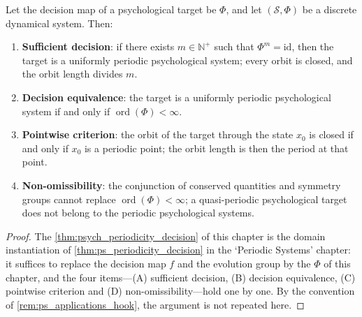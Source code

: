 \begin{theorem}\label{thm:psych_periodicity_decision}
Let the decision map of a psychological target be $\Phi$, and let $(\mathcal S,\Phi)$ be a discrete dynamical system. Then:
\begin{enumerate}[label=(\Alph*)]
    \item \textbf{Sufficient decision}: if there exists $m\in\mathbb N^+$ such that $\Phi^m=\mathrm{id}$, then the target is a uniformly periodic psychological system; every orbit is closed, and the orbit length divides $m$.
    \item \textbf{Decision equivalence}: the target is a uniformly periodic psychological system if and only if $\operatorname{ord}(\Phi)<\infty$.
    \item \textbf{Pointwise criterion}: the orbit of the target through the state $x_0$ is closed if and only if $x_0$ is a periodic point; the orbit length is then the period at that point.
    \item \textbf{Non-omissibility}: the conjunction of conserved quantities and symmetry groups cannot replace $\operatorname{ord}(\Phi)<\infty$; a quasi-periodic psychological target does not belong to the periodic psychological systems.
\end{enumerate}
\end{theorem}

\begin{proof}
The \cref{thm:psych_periodicity_decision} of this chapter is the domain instantiation of \cref{thm:ps_periodicity_decision} in the `Periodic Systems' chapter:
it suffices to replace the decision map $f$ and the evolution group by the $\Phi$ of this chapter, and the four items---(A) sufficient decision, (B) decision equivalence, (C) pointwise criterion and
(D) non-omissibility---hold one by one. By the convention of \cref{rem:ps_applications_hook}, the argument is not repeated here.
\end{proof}

